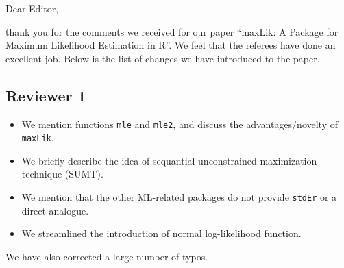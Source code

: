 \documentclass[a4paper]{article}
\begin{document}
Dear Editor,

thank you for the comments we received for our paper ``maxLik: A
Package for Maximum Likelihood Estimation in R''.  We feel that the
referees have done an excellent job.  Below is the list of changes we
have introduced to the paper.

\subsection*{Reviewer 1}

\begin{itemize}
\item We mention functions \texttt{mle} and \texttt{mle2}, and discuss
  the advantages/novelty of \texttt{maxLik}.
\item We briefly describe the idea of sequantial unconstrained
  maximization technique (SUMT).
\item We mention that the other ML-related packages do not provide
  \texttt{stdEr} or a direct analogue.
\item We streamlined the introduction of normal log-likelihood function.
\end{itemize}


We have also corrected a large number of typos.



\end{document}
